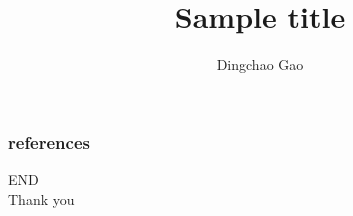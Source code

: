 \documentclass[aspectratio=1610]{beamer}
\title{Sample title}
\author[Gcc]{Dingchao Gao}
\institute[ISCAS]{Institute of Software Chinese Academy of Sciences}
\begin{document}
\begin{frame}[plain]
  \titlepage
\end{frame}






\begin{frame}
	\frametitle{references}
	\printbibliography
\end{frame}
\begin{frame}
\centering
\Huge{END\\Thank you}
\end{frame}
\end{document}
